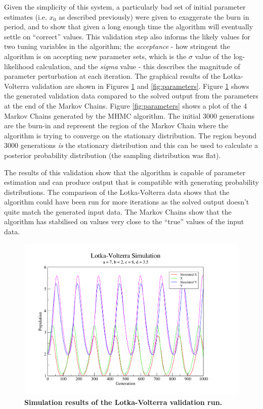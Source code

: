Given the simplicity of this system, a particularly bad set of initial parameter estimates (i.e. $x_0$ as described previously) were given to exaggerate the burn in period, and to show that given a long enough time the algorithm will eventually settle on ``correct'' values. This validation step also informs the likely values for two tuning variables in the algorithm; the \textit{acceptance} - how stringent the algorithm is on accepting new parameter sets, which is the $\sigma$ value of the log-likelihood calculation, and the \textit{sigma} value - this describes the magnitude of parameter perturbation at each iteration.
The graphical results of the Lotka-Volterra validation are shown in Figures \ref{fig:simulation} and \ref{fig:parameters}. Figure \ref{fig:simulation} shows the generated validation data compared to the solved output from the parameters at the end of the Markov Chains. Figure \ref{fig:parameters} shows a plot of the 4 Markov Chains generated by the MHMC algorithm. The initial 3000 generations are the burn-in and represent the region of the Markov Chain where the algorithm is trying to converge on the stationary distribution. The region beyond 3000 generations \textit{is} the stationary distribution and this can be used to calculate a posterior probability distribution (the sampling distribution was flat).

The results of this validation show that the algorithm is capable of parameter estimation and can produce output that is compatible with generating probability distributions. The comparison of the Lotka-Volterra data shows that the algorithm could have been run for more iterations as the solved output doesn't quite match the generated input data. The Markov Chains show that the algorithm has stabilised on values very close to the ``true'' values of the input data.

\begin{figure}[tbp]
 \centering
 \includegraphics[width=13cm, trim=50px 35px 125px 30px, clip=true]{./03-parameterestimationmethodologies/data/LV_data.pdf}
 \caption[{Simulation results of the Lotka-Volterra validation run.}]{{\bf Simulation results of the Lotka-Volterra validation run.}
 \label{fig:simulation}}
\end{figure}

